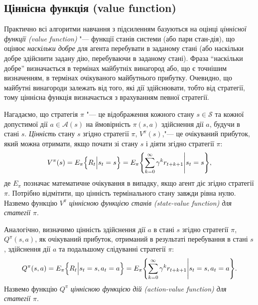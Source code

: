 \subsection{Ціннісна функція (value function)}

Практично всі алгоритми навчання з підсиленням базуються на оцінці \emph{ціннісної функції (value function)} "--- функції станів системи (або пари стан-дія), що оцінює \emph{наскільки добре} для агента перебувати в заданому стані (або наскільки добре здійснити задану дію, перебуваючи в заданому стані). Фраза ``наскільки добре'' визначається в термінах майбутніх винагород або, що є точнішим визначенням, в термінах очікуваного майбутнього прибутку. Очевидно, що майбутні винагороди залежать від того, які дії здійснювати, тобто від стратегії, тому ціннісна функція визначається з врахуванням певної стратегії.

Нагадаємо, що стратегія $\pi$ "--- це відображення кожного стану $s \in \mathcal{S}$ та кожної допустимої дії $a \in \mathcal{A}(s)$ на ймовірність $\pi(s,a)$ здійснення дії $a$, будучи в стані $s$. \emph{Цінність} стану $s$ згідно стратегії $\pi$, $V^\pi(s)$,"--- це очікуваний прибуток, який можна отримати, якщо почати зі стану $s$ і діяти згідно стратегії $\pi$:
\begin{equation}
V^\pi(s) = E_\pi \Bigl\{ R_t \Big| s_t = s \Bigr \} = E_\pi \Biggl\{\sum_{k=0}^{\infty}\gamma^k r_{t+k+1} \Bigg| s_t=s \Biggr\},
\end{equation}
де $E_\pi{}$ позначає математичне очікування в випадку, якщо агент діє згідно стратегії $\pi$. Потрібно відмітити, що цінність термінального стану завжди рівна нулю. Назвемо функцію $V^\pi$ \emph{ціннісною функцією станів (state-value function) для статегії $\pi$}.

Аналогічно, визначимо цінність здійснення дії $a$ в стані $s$ згідно стратегії $\pi$, $Q^\pi(s,a)$, як очікуваний прибуток, отриманий в результаті перебування в стані $s$, здійснення дії $a$ та подальшому слідуванні стратегії $\pi$:
\begin{equation}
Q^\pi(s,a)=E_\pi \Bigl\{ R_t \Big| s_t=s, a_t=a \Bigr\} = E_\pi \Biggl\{\sum_{k=0}^{\infty}\gamma^k r_{t+k+1} \Bigg| s_t=s,a_t=a \Biggr\}.
\end{equation}
Назвемо функцію $Q^\pi$ \emph{ціннісною функцією дій (action-value function) для статегії $\pi$}.

